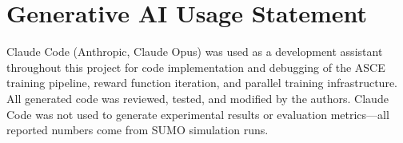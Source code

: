 \documentclass{article}
\begin{document}
\section*{Generative AI Usage Statement}

Claude Code (Anthropic, Claude Opus) was used as a development assistant throughout this project for code implementation and debugging of the ASCE training pipeline, reward function iteration, and parallel training infrastructure. All generated code was reviewed, tested, and modified by the authors. Claude Code was not used to generate experimental results or evaluation metrics---all reported numbers come from SUMO simulation runs.
\end{document}
